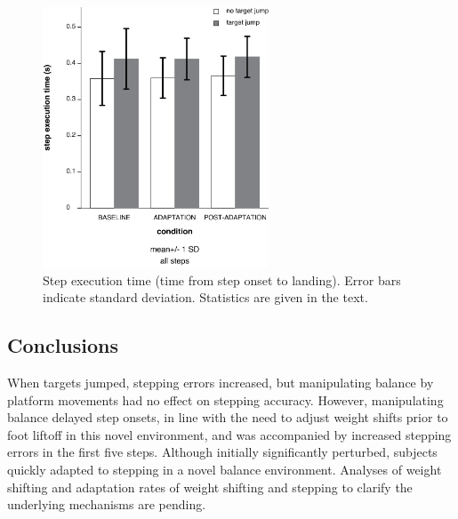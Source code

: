 \begin{figure}[!ht]
	\centering
	\includegraphics[width=0.6\textwidth]{"Zrinka/step exec time-all steps"}
	\caption{Step execution time (time from step onset to landing). Error bars indicate standard deviation. Statistics are given in the text.}
	\label{fig:stepExecTimeAll}
\end{figure}

\subsection{Conclusions}
When targets jumped, stepping errors increased, but manipulating balance by platform movements had no effect on stepping accuracy. However, manipulating balance delayed step onsets, in line with the need to adjust weight shifts prior to foot liftoff in this novel environment, and was accompanied by increased stepping errors in the first five steps. Although initially significantly perturbed, subjects quickly adapted to stepping in a novel balance environment. Analyses of weight shifting and adaptation rates of weight shifting and stepping to clarify the underlying mechanisms are pending.